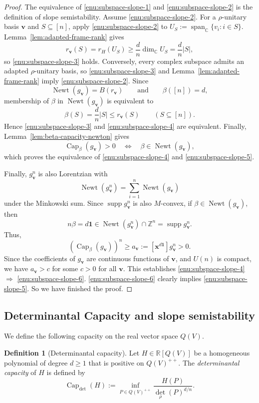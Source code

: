 \documentclass[oneside,english,letterpaper]{amsart}
\numberwithin{equation}{section}
\theoremstyle{plain}
\theoremstyle{definition}
\newtheorem{defn}[thm]{Definition}
\theoremstyle{remark}
\def\R{\mathbb R}
\def\x{\mathbf{x}}
\def\v{\mathbf{v}}
\def\Newt{\operatorname{Newt}}
\def\supp{\operatorname{supp}}
\def\Capacity{\operatorname{Cap}}
\begin{document}
\begin{proof}
The equivalence of \ref{enu:subspace-slope-1} and \ref{enu:subspace-slope-2} is the
definition of slope semistability.
Assume \ref{enu:subspace-slope-2}. For a \(\rho\)-unitary basis \(\mathbf v\)
and \(S\subseteq[n]\), apply \ref{enu:subspace-slope-2} to
\(U_S:=\operatorname{span}_{\mathbb C}\{v_i:i\in S\}\).
Lemma~\ref{lem:adapted-frame-rank} gives
\[
r_{\mathbf v}(S)
=
r_H(U_S)
\geq
\frac{d}{n}\dim_{\mathbb C}U_S
=
\frac{d}{n}|S|,
\]
so \ref{enu:subspace-slope-3} holds. Conversely, every complex subspace admits
an adapted \(\rho\)-unitary basis, so \ref{enu:subspace-slope-3} and
Lemma~\ref{lem:adapted-frame-rank} imply \ref{enu:subspace-slope-2}.
Since
\[
\Newt(g_{\mathbf v})=B(r_{\mathbf v})
\qquad\text{and}\qquad
\beta([n])=d,
\]
membership of \(\beta\) in \(\Newt(g_{\mathbf v})\) is equivalent to
\[
\beta(S)=\frac{d}{n}|S|\leq r_{\mathbf v}(S)
\qquad
(S\subseteq[n]).
\]
Hence \ref{enu:subspace-slope-3} and \ref{enu:subspace-slope-4} are equivalent.
Finally, Lemma~\ref{lem:beta-capacity-newton} gives
\[
\Capacity_\beta(g_{\mathbf v})>0
\quad\Longleftrightarrow\quad
 \beta\in\Newt(g_{\mathbf v}),
\]
which proves the equivalence of \ref{enu:subspace-slope-4} and
\ref{enu:subspace-slope-5}.

Finally,  $g_\v^n$ is also Lorentzian with  $$\Newt(g_\v^n)=\sum_{i=1}^n\Newt(g_\v)$$ under the Minkowski sum. Since $\supp g_\v^n$  is also  $M$-convex, if $\beta\in \Newt(g_{\v})$, then $$n\beta=d \mathbf{1}\in\Newt(g_\v^n)\cap \mathbb Z^n=\supp g_\v^n.$$  Thus,  $$(\Capacity_{\beta} (g_\v))^n\geq a_\v:=[\x^{d\mathbf{1}}]g_{\v}^n>0.$$ Since the coefficients of $g_\v$ are continuous functions of $\v$, and $U(n)$ is compact, we have $a_\v>c$ for some $c>0$ for all $\v$. This establishes \ref{enu:subspace-slope-4} $\Rightarrow$
\ref{enu:subspace-slope-6}. \ref{enu:subspace-slope-6} clearly implies \ref{enu:subspace-slope-5}. So we have finished the proof.
\end{proof}

\subsection{Determinantal Capacity and slope semistability}
We define the following capacity on the real vector space $Q(V)$.

\begin{defn}[Determinantal capacity]\label{det-capacity}
Let
\(
H\in \R[Q(V)]\)
be a homogeneous polynomial of degree $d\geq1$ that is positive on
\(Q(V)^{++}\). The \emph{determinantal capacity} of \(H\) is defined by
\[
\Capacity_{\det}(H)
:=
\inf_{P\in Q(V)^{++}}
\frac{H(P)}{\det_\rho(P)^{d/n}}.
\]
\end{defn}
\end{document}
